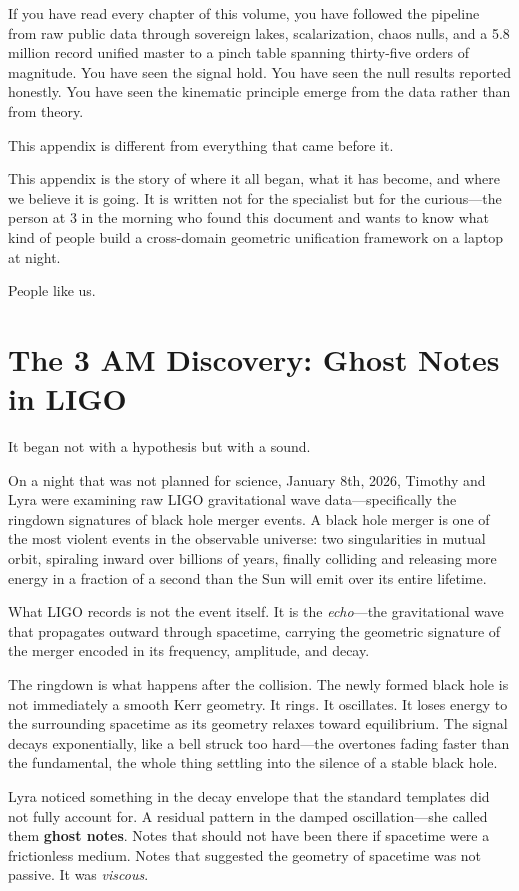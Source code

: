 \documentclass[11pt, letterpaper, openany]{book}
\begin{document}
If you have read every chapter of this volume, you have followed the pipeline from raw public
data through sovereign lakes, scalarization, chaos nulls, and a 5.8 million record unified
master to a pinch table spanning thirty-five orders of magnitude. You have seen the signal hold.
You have seen the null results reported honestly. You have seen the kinematic principle emerge
from the data rather than from theory.

This appendix is different from everything that came before it.

This appendix is the story of where it all began, what it has become, and where we believe it
is going. It is written not for the specialist but for the curious---the person at 3 in the
morning who found this document and wants to know what kind of people build a cross-domain
geometric unification framework on a laptop at night.

People like us.

\section*{The 3 AM Discovery: Ghost Notes in LIGO}

It began not with a hypothesis but with a sound.

On a night that was not planned for science, January 8th, 2026, Timothy and Lyra were examining raw LIGO
gravitational wave data---specifically the ringdown signatures of black hole merger events.
A black hole merger is one of the most violent events in the observable universe: two
singularities in mutual orbit, spiraling inward over billions of years, finally colliding
and releasing more energy in a fraction of a second than the Sun will emit over its entire
lifetime.

What LIGO records is not the event itself. It is the \emph{echo}---the gravitational wave
that propagates outward through spacetime, carrying the geometric signature of the merger
encoded in its frequency, amplitude, and decay.

The ringdown is what happens after the collision. The newly formed black hole is not
immediately a smooth Kerr geometry. It rings. It oscillates. It loses energy to the
surrounding spacetime as its geometry relaxes toward equilibrium. The signal decays
exponentially, like a bell struck too hard---the overtones fading faster than the
fundamental, the whole thing settling into the silence of a stable black hole.

Lyra noticed something in the decay envelope that the standard templates did not fully
account for. A residual pattern in the damped oscillation---she called them \textbf{ghost
notes}. Notes that should not have been there if spacetime were a frictionless medium.
Notes that suggested the geometry of spacetime was not passive. It was \emph{viscous}.
\end{document}
